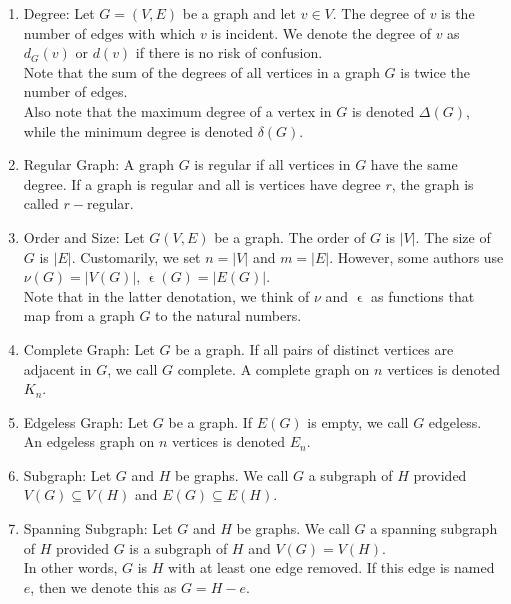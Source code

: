 \documentclass{article}
\begin{document}
\begin{enumerate}
		\item Degree: Let $G=(V,E)$ be a graph and let $v\in V$.
		The degree of $v$ is the number of edges with which $v$ is incident.
		We denote the degree of $v$ as $d_G(v)$ or $d(v)$ if there is no risk of confusion.\\
		
		Note that the sum of the degrees of all vertices in a graph $G$ is twice the number of edges.\\
		
		Also note that the maximum degree of a vertex in $G$ is denoted $\Delta(G)$, while the minimum degree is denoted $\delta(G)$.
		
		\item Regular Graph: A graph $G$ is regular if all vertices in $G$ have the same degree.
		If a graph is regular and all is vertices have degree $r$, the graph is called $r-$regular.
		
		\item Order and Size: Let $G(V,E)$ be a graph.
		The order of $G$ is $|V|$.
		The size of $G$ is $|E|$.
		Customarily, we set $n=|V|$ and $m=|E|$.
		However, some authors use $\nu(G)=|V(G)|$, $\upvarepsilon(G)=|E(G)|$.\\
		
		Note that in the latter denotation, we think of $\nu$ and $\upvarepsilon$ as functions that map from a graph $G$ to the natural numbers.
		
		\item Complete Graph: Let $G$ be a graph.
		If all pairs of distinct vertices are adjacent in $G$, we call $G$ complete.
		A complete graph on $n$ vertices is denoted $K_n$.
		
		\item Edgeless Graph: Let $G$ be a graph.
		If $E(G)$ is empty, we call $G$ edgeless.
		An edgeless graph on $n$ vertices is denoted $E_n$.
		
		\item Subgraph: Let $G$ and $H$ be graphs.
		We call $G$ a subgraph of $H$ provided $V(G)\subseteq V(H)$ and $E(G)\subseteq E(H)$.
		
		\item Spanning Subgraph: Let $G$ and $H$ be graphs.
		We call $G$ a spanning subgraph of $H$ provided $G$ is a subgraph of $H$ and $V(G)=V(H)$.\\
		
		In other words, $G$ is $H$ with at least one edge removed.
		If this edge is named $e$, then we denote this as $G=H-e$.
		

\end{enumerate}
\end{document}
